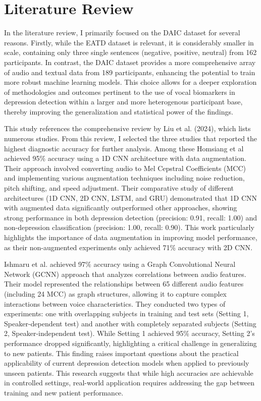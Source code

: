 \section{Literature Review}
In the literature review, I primarily focused on the DAIC dataset for several reasons. Firstly, while the EATD dataset is relevant, it is considerably smaller in scale, containing only three single sentences (negative, positive, neutral) from 162 participants. In contrast, the DAIC dataset provides a more comprehensive array of audio and textual data from 189 participants, enhancing the potential to train more robust machine learning models. This choice allows for a deeper exploration of methodologies and outcomes pertinent to the use of vocal biomarkers in depression detection within a larger and more heterogenous participant base, thereby improving the generalization and statistical power of the findings.

This study references the comprehensive review by Liu et al. (2024)\cite{liu2024diagnostic}, which lists numerous studies. From this review, I selected the three studies that reported the highest diagnostic accuracy for further analysis. Among these Homsiang et al \cite{homsiang2022classification} achieved 95\% accuracy using a 1D CNN architecture with data augmentation. Their approach involved converting audio to Mel Cepstral Coefficients (MCC) \cite{wiki:mel_frequency_cepstrum} and implementing various augmentation techniques including noise reduction, pitch shifting, and speed adjustment. Their comparative study of different architectures (1D CNN, 2D CNN, LSTM, and GRU) demonstrated that 1D CNN with augmented data significantly outperformed other approaches, showing strong performance in both depression detection (precision: 0.91, recall: 1.00) and non-depression classification (precision: 1.00, recall: 0.90). This work particularly highlights the importance of data augmentation in improving model performance, as their non-augmented experiments only achieved 71\% accuracy with 2D CNN.

Ishmaru et al. \cite{ishimaru2023classification} achieved 97\% accuracy using a Graph Convolutional Neural Network (GCNN) approach that analyzes correlations between audio features. Their model represented the relationships between 65 different audio features (including 24 MCC) as graph structures, allowing it to capture complex interactions between voice characteristics. They conducted two types of experiments: one with overlapping subjects in training and test sets (Setting 1, Speaker-dependent test) and another with completely separated subjects (Setting 2, Speaker-independent test). While Setting 1 achieved 95\% accuracy, Setting 2's performance dropped significantly, highlighting a critical challenge in generalizing to new patients. This finding raises important questions about the practical applicability of current depression detection models when applied to previously unseen patients. This research suggests that while high accuracies are achievable in controlled settings, real-world application requires addressing the gap between training and new patient performance.

